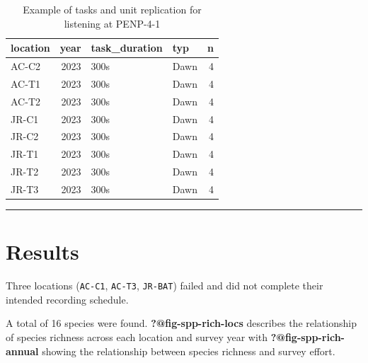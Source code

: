 \documentclass[
  letterpaper,
  DIV=11,
  numbers=noendperiod,
  oneside]{scrartcl}
\begin{document}
\hypertarget{tbl-loc-repl}{}
\begin{table}
\caption{\label{tbl-loc-repl}Example of tasks and unit replication for listening at PENP-4-1 }\tabularnewline

\centering
\begin{tabular}{l|r|l|l|r}
\hline
location & year & task\_duration & typ & n\\
\hline
AC-C2 & 2023 & 300s & Dawn & 4\\
\hline
AC-T1 & 2023 & 300s & Dawn & 4\\
\hline
AC-T2 & 2023 & 300s & Dawn & 4\\
\hline
JR-C1 & 2023 & 300s & Dawn & 4\\
\hline
JR-C2 & 2023 & 300s & Dawn & 4\\
\hline
JR-T1 & 2023 & 300s & Dawn & 4\\
\hline
JR-T2 & 2023 & 300s & Dawn & 4\\
\hline
JR-T3 & 2023 & 300s & Dawn & 4\\
\hline
\end{tabular}
\end{table}

\begin{center}\rule{0.5\linewidth}{0.5pt}\end{center}

\hypertarget{results}{%
\section{Results}\label{results}}

Three locations (\texttt{AC-C1}, \texttt{AC-T3}, \texttt{JR-BAT}) failed
and did not complete their intended recording schedule.

A total of 16 species were found. \textbf{?@fig-spp-rich-locs} describes
the relationship of species richness across each location and survey
year with \textbf{?@fig-spp-rich-annual} showing the relationship
between species richness and survey effort.
\end{document}
